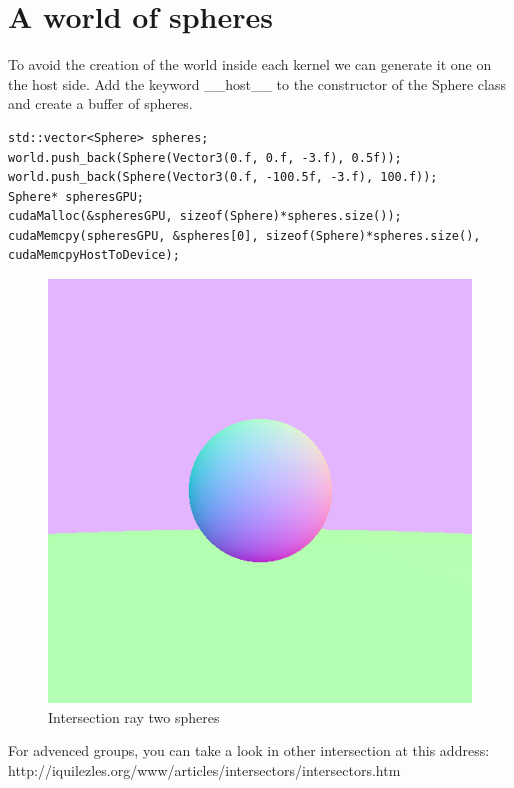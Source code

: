 \documentclass{article}
\begin{document}
\section{A world of spheres}
To avoid the creation of the world inside each kernel we can generate it one on the host side. Add the keyword \_\_host\_\_ to the constructor of the Sphere class and create a buffer of spheres. 
\begin{lstlisting}
std::vector<Sphere> spheres;
world.push_back(Sphere(Vector3(0.f, 0.f, -3.f), 0.5f));
world.push_back(Sphere(Vector3(0.f, -100.5f, -3.f), 100.f));
Sphere* spheresGPU;
cudaMalloc(&spheresGPU, sizeof(Sphere)*spheres.size());
cudaMemcpy(spheresGPU, &spheres[0], sizeof(Sphere)*spheres.size(), cudaMemcpyHostToDevice);
\end{lstlisting}
\begin{figure}[h]
	\centering
	\includegraphics[scale=0.45]{figures/intersectnormaltwosphere.png}
	\caption{Intersection ray two spheres}
\end{figure}

For advenced groups, you can take a look in other intersection at this address: http://iquilezles.org/www/articles/intersectors/intersectors.htm

\newpage
\end{document}
